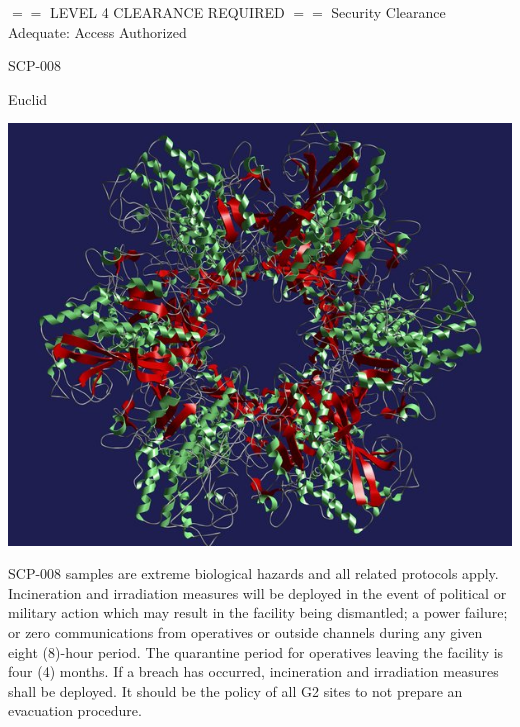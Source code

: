 \begin{center}
$==$ LEVEL 4 CLEARANCE REQUIRED $==$\linebreak
Security Clearance Adequate: Access Authorized
\end{center}

 SCP-008

 Euclid

\begin{center}
\includegraphics[scale=0.33]{scp/008.jpg}
\end{center}

 SCP-008 samples are extreme biological hazards and all related protocols apply. Incineration and irradiation measures will be deployed in the event of political or military action which may result in the facility being dismantled; a power failure; or zero communications from operatives or outside channels during any given eight (8)-hour period. The quarantine period for operatives leaving the facility is four (4) months. If a breach has occurred, incineration and irradiation measures shall be deployed. It should be the policy of all G2 sites to not prepare an evacuation procedure.

